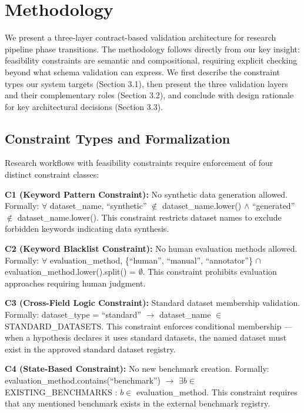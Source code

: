 \section{Methodology}

We present a three-layer contract-based validation architecture for research pipeline phase transitions. The methodology follows directly from our key insight: feasibility constraints are semantic and compositional, requiring explicit checking beyond what schema validation can express. We first describe the constraint types our system targets (Section 3.1), then present the three validation layers and their complementary roles (Section 3.2), and conclude with design rationale for key architectural decisions (Section 3.3).

\subsection{Constraint Types and Formalization}

Research workflows with feasibility constraints require enforcement of four distinct constraint classes:

\textbf{C1 (Keyword Pattern Constraint):} No synthetic data generation allowed. Formally: $\forall$ dataset\_name, ``synthetic'' $\notin$ dataset\_name.lower() $\land$ ``generated'' $\notin$ dataset\_name.lower(). This constraint restricts dataset names to exclude forbidden keywords indicating data synthesis.

\textbf{C2 (Keyword Blacklist Constraint):} No human evaluation methods allowed. Formally: $\forall$ evaluation\_method, \{``human'', ``manual'', ``annotator''\} $\cap$ evaluation\_method.lower().split() = $\emptyset$. This constraint prohibits evaluation approaches requiring human judgment.

\textbf{C3 (Cross-Field Logic Constraint):} Standard dataset membership validation. Formally: dataset\_type = ``standard'' $\rightarrow$ dataset\_name $\in$ STANDARD\_DATASETS. This constraint enforces conditional membership --- when a hypothesis declares it uses standard datasets, the named dataset must exist in the approved standard dataset registry.

\textbf{C4 (State-Based Constraint):} No new benchmark creation. Formally: evaluation\_method.contains(``benchmark'') $\rightarrow$ $\exists b \in$ EXISTING\_BENCHMARKS : $b \in$ evaluation\_method. This constraint requires that any mentioned benchmark exists in the external benchmark registry.

